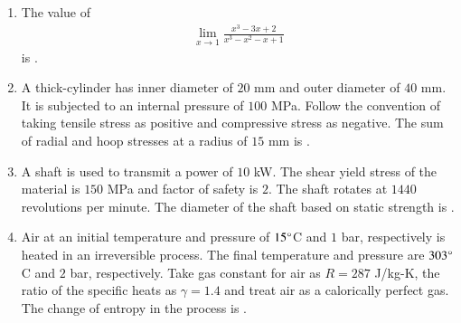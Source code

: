 \documentclass[journal,12pt,onecolumn]{IEEEtran}
\theoremstyle{remark}
\begin{document}
\begin{enumerate}
    \hfill{}
    \begin{enumerate}
    \end{enumerate}
    \item The value of
    \begin{align*}
        \lim_{x\rightarrow1}\frac{x^{3}-3x+2}{x^{3}-x^{2}-x+1}
    \end{align*}
    is \underline{\hspace{2cm}}.

    \hfill{}

    \item A thick-cylinder has inner diameter of $20$ mm and outer diameter of $40$ mm. It is subjected to an internal pressure of $100$ MPa. Follow the convention of taking tensile stress as positive and compressive stress as negative. The sum of radial and hoop stresses  at a radius of $15$ mm is \underline{\hspace{2cm}}.

    \hfill{}

    \item A shaft is used to transmit a power of $10$ kW. The shear yield stress of the material is $150$ MPa and factor of safety is $2$. The shaft rotates at $1440$ revolutions per minute. The diameter of the shaft  based on static strength is \underline{\hspace{2cm}}.

    \hfill{}

    \item Air at an initial temperature and pressure of $15\degree$C and $1$ bar, respectively is heated in an irreversible process. The final temperature and pressure are $303\degree$C and $2$ bar, respectively. Take gas constant for air as $R=287$ J/kg-K, the ratio of the specific heats as $\gamma=1.4$ and treat air as a calorically perfect gas. The change of entropy  in the process is \underline{\hspace{2cm}}.


\end{enumerate}
\end{document}
